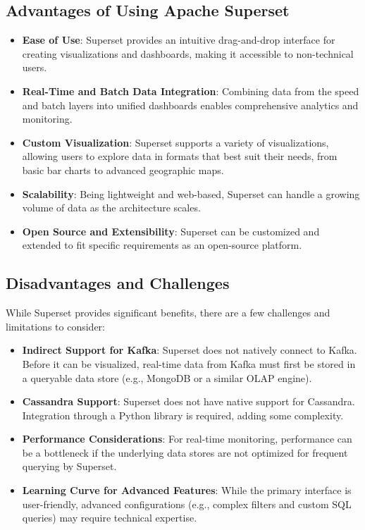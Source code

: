 \documentclass[12pt,a4paper, hidelinks]{article}
\begin{document}
\subsection{Advantages of Using Apache Superset}
\begin{itemize}
    \item \textbf{Ease of Use}: Superset provides an intuitive drag-and-drop interface for creating visualizations and dashboards, making it accessible to non-technical users.
    \item \textbf{Real-Time and Batch Data Integration}: Combining data from the speed and batch layers into unified dashboards enables comprehensive analytics and monitoring.
    \item \textbf{Custom Visualization}: Superset supports a variety of visualizations, allowing users to explore data in formats that best suit their needs, from basic bar charts to advanced geographic maps.
    \item \textbf{Scalability}: Being lightweight and web-based, Superset can handle a growing volume of data as the architecture scales.
    \item \textbf{Open Source and Extensibility}: Superset can be customized and extended to fit specific requirements as an open-source platform.
\end{itemize}

\subsection{Disadvantages and Challenges}
While Superset provides significant benefits, there are a few challenges and limitations to consider:
\begin{itemize}
    \item \textbf{Indirect Support for Kafka}: Superset does not natively connect to Kafka. Before it can be visualized, real-time data from Kafka must first be stored in a queryable data store (e.g., MongoDB or a similar OLAP engine).
    \item \textbf{Cassandra Support}: Superset does not have native support for Cassandra. Integration through a Python library is required, adding some complexity.
    \item \textbf{Performance Considerations}: For real-time monitoring, performance can be a bottleneck if the underlying data stores are not optimized for frequent querying by Superset.
    \item \textbf{Learning Curve for Advanced Features}: While the primary interface is user-friendly, advanced configurations (e.g., complex filters and custom SQL queries) may require technical expertise.
\end{itemize}
\end{document}

